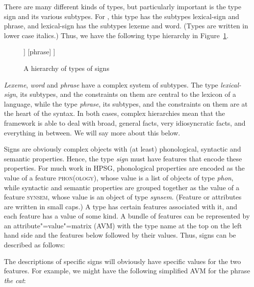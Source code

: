 \documentclass[output=paper
	        ,collection
	        ,collectionchapter
 	        ,biblatex
                ,babelshorthands
                ,newtxmath
                ,draftmode
                ,colorlinks, citecolor=brown
]{langscibook}
\begin{document}
There are many different kinds of types, but particularly important is the type sign and its various subtypes. For \citet[19]{GSag2000a-u}, this type has the subtypes lexical-sign and phrase, and lexical-sign has the subtypes lexeme and word. (Types are written in lower case italics.) Thus, we have the following type hierarchy in Figure~\ref{fig:prop1}.


\begin{figure}[h!]
	\itshape
\begin{forest}
[sign
	[lexical-sign
		[lexeme]
		[word]
	]
	[phrase]
]
\end{forest}

\caption{A hierarchy of types of signs}\label{fig:prop1}
\end{figure}


\emph{Lexeme}, \emph{word} and \emph{phrase} have a complex system of subtypes. The type \emph{lexical-sign}, its subtypes, and the constraints on them are central to the lexicon of a language, while the type \emph{phrase}, its subtypes, and the constraints on them are at the heart of the syntax. In both cases, complex hierarchies mean that the framework is able to deal with broad, general facts, very idiosyncratic facts, and everything in between. We will say more about this below.

Signs are obviously complex objects with (at least) phonological, syntactic and semantic properties. Hence, the type \emph{sign} must have features that encode these properties. For much work in HPSG, phonological properties are encoded as the value of a feature \textsc{phon(ology)}, whose value is a list of objects of type \emph{phon}, while syntactic and semantic properties are grouped together as the value of a feature \textsc{synsem}, whose value is an object of type \emph{synsem}. (Feature or attributes are written in small caps.) A type has certain features associated with it, and each feature has a value of some kind. A bundle of features can be represented by an attribute"=value"=matrix (AVM) with the type name at the top on the left hand side and the features below followed by their values. Thus, signs can be described as follows:


\ea\label{ex:prop4}
\z
{}


The descriptions of specific signs will obviously have specific values for the two features. For example, we might have the following simplified AVM for the phrase \emph{the cat}:
\end{document}
